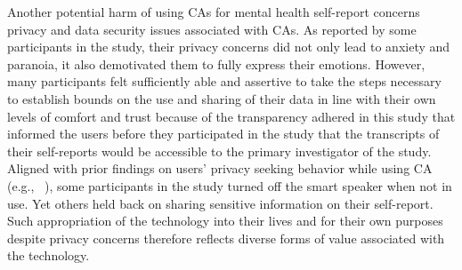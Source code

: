         Another potential harm of using \acp{CA} for mental health self-report concerns privacy and data security issues associated with \ac{CA}s. As reported by some participants in the study, their privacy concerns did not only lead to anxiety and paranoia, it also demotivated them to fully express their emotions. However, many participants felt sufficiently able and assertive to take the steps necessary to establish bounds on the use and sharing of their data in line with their own levels of comfort and trust because of the transparency adhered in this study that informed the users before they participated in the study that the transcripts of their self-reports would be accessible to the primary investigator of the study. 
        Aligned with prior findings on users' privacy seeking behavior while using \ac{CA} (e.g., ~\cite{pradhan2018accessibility, lau2018alexa}), some participants in the study turned off the smart speaker when not in use. Yet others held back on sharing sensitive information on their self-report. Such appropriation of the technology into their lives and for their own purposes despite privacy concerns therefore reflects diverse forms of value associated with the technology.

    
    
    
    

